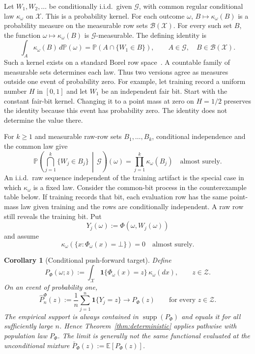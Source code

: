 \documentclass[11pt]{article}
\newtheorem{corollary}[theorem]{Corollary}
\theoremstyle{definition}
\newcommand{\cZ}{\mathcal{Z}}
\newcommand{\supp}{\operatorname{supp}}
\newcommand{\E}{\mathbb{E}}
\newcommand{\Prb}{\mathbb{P}}
\newcommand{\Ind}{\mathbf{1}}
\begin{document}
Let $W_1,W_2,\ldots$ be conditionally i.i.d.\ given $\mathcal G$, with common regular conditional
law $\kappa_\omega$ on $\mathcal X$. This is a probability kernel. For each outcome $\omega$,
$B\mapsto\kappa_\omega(B)$ is a probability measure on the measurable row sets
$\mathcal B(\mathcal X)$. For every such set $B$, the function $\omega\mapsto\kappa_\omega(B)$
is $\mathcal G$-measurable. The defining identity is
\[
 \int_A\kappa_\omega(B)\,d\Prb(\omega)
 =\Prb(A\cap\{W_1\in B\}),\qquad A\in\mathcal G,\quad B\in\mathcal B(\mathcal X).
\]
Such a kernel exists on a standard Borel row space~\cite{kallenberg2021,durrett2019}. A
countable family of measurable sets determines each law. Thus two versions agree as measures
outside one event of probability zero. For example, let training record a uniform number $H$
in $[0,1]$ and let $W_1$ be an independent fair bit. Start with the constant fair-bit kernel.
Changing it to a point mass at zero on $H=1/2$ preserves the identity because this event has
probability zero. The identity does not determine the value there.

For $k\ge1$ and measurable raw-row sets $B_1,\ldots,B_k$, conditional independence and the
common law give
\[
 \Prb\!\left(\bigcap_{j=1}^k\{W_j\in B_j\}\,\middle|\,\mathcal G\right)(\omega)
 =\prod_{j=1}^k\kappa_\omega(B_j)\quad\text{almost surely}.
\]
An i.i.d.\ raw sequence independent of the training artifact
is the special case in which $\kappa_\omega$ is a fixed law. Consider the common-bit process
in the counterexample table below. If training records that bit, each evaluation row has the
same point-mass law given training and the rows are conditionally independent. A raw row
still reveals the training bit. Put
\[
  Y_j(\omega):=\Phi(\omega,W_j(\omega))
\]
and assume
\begin{equation}\label{eq:frozen-total}
  \kappa_\omega\!\left(\{x:\Phi_\omega(x)=\bot\}\right)=0
  \quad\text{almost surely}.
\end{equation}

\begin{corollary}[Conditional push-forward target]\label{cor:transform}
Define
\[
  P_\Phi(\omega;z)
  :=\int_{\mathcal X}\Ind\{\Phi_\omega(x)=z\}\,\kappa_\omega(dx),
  \qquad z\in\cZ.
\]
On an event of probability one,
\[
  \widehat P^\Phi_n(z)
  :=\frac1n\sum_{j=1}^{n}\Ind\{Y_j=z\}
  \longrightarrow P_\Phi(z)
  \qquad\text{for every }z\in\cZ.
\]
The empirical support is always contained in $\supp(P_\Phi)$ and equals it for all sufficiently
large $n$.  Hence Theorem~\ref{thm:deterministic} applies pathwise with population law $P_\Phi$.
The limit is generally not the same functional evaluated at the unconditional mixture
$\bar P_\Phi(z):=\E[P_\Phi(z)]$.
\end{corollary}
\end{document}
